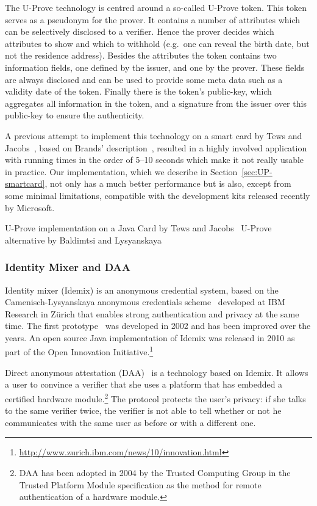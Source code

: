 The U-Prove technology is centred around a so-called U-Prove token. This
token serves as a pseudonym for the prover. It contains a number of
attributes which can be selectively disclosed to a verifier. Hence the
prover decides which attributes to show and which to withhold (e.g.\ one
can reveal the birth date, but not the residence address). Besides the
attributes the token contains two information fields, one defined by the
issuer, and one by the prover. These fields are always disclosed and can be
used to provide some meta data such as a validity date of the token.
Finally there is the token's public-key, which aggregates all information
in the token, and a signature from the issuer over this public-key to
ensure the authenticity.

A previous attempt to implement this technology on a smart card by Tews and
Jacobs~\cite{TewsJacobs09}, based on Brands' description~\cite{Brands2000},
resulted in a highly involved application with running times in the order
of 5--10 seconds which make it not really usable in practice. Our
implementation, which we describe in Section~\ref{sec:UP-smartcard}, not only
has a much better performance but is also, except from some minimal
limitations, compatible with the development kits released recently by
Microsoft.

U-Prove implementation on a Java Card by Tews and Jacobs~\cite{TewsJacobs09}
U-Prove alternative by Baldimtsi and Lysyanskaya~\cite{BaLy2012}

\subsubsection{Identity Mixer and DAA}\label{sec:idemix}

Identity mixer (Idemix) is an anonymous credential system, based on the
Camenisch-Lysyanskaya anonymous credentials
scheme~\cite{CamenischLysyanskaya2001, CamenischLysyanskaya2003,
Lysyanskaya2002} developed at IBM Research in Z\"urich that enables strong
authentication and privacy at the same time. The first
prototype~\cite{CamenischH02} was developed in 2002 and has been improved
over the years. An open source Java implementation of Idemix was released
in 2010 as part of the Open Innovation
Initiative.\footnote{\url{http://www.zurich.ibm.com/news/10/innovation.html}}

Direct anonymous attestation (DAA)~\cite{BrickellCC04} is a technology based
on Idemix. It allows a user to convince a verifier that she uses a platform
that has embedded a certified hardware module.\footnote{DAA has
been adopted in 2004 by the Trusted Computing Group in the Trusted Platform Module
specification as the method for remote authentication of a hardware
module.} The protocol protects the user's privacy: if she talks to the same
verifier twice, the verifier is not able to tell whether or not he
communicates with the same user as before or with a different one.


